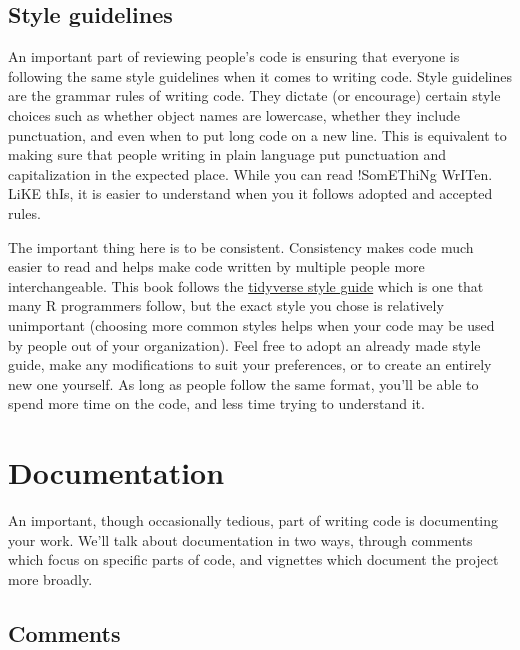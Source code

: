 \documentclass[
  12pt,
  openany]{book}
\begin{document}
\hypertarget{style-guidelines}{%
\subsection{Style guidelines}\label{style-guidelines}}

An important part of reviewing people's code is ensuring that everyone is following the same style guidelines when it comes to writing code. Style guidelines are the grammar rules of writing code. They dictate (or encourage) certain style choices such as whether object names are lowercase, whether they include punctuation, and even when to put long code on a new line. This is equivalent to making sure that people writing in plain language put punctuation and capitalization in the expected place. While you can read !SomEThiNg WrITen. LiKE thIs, it is easier to understand when you it follows adopted and accepted rules.

The important thing here is to be consistent. Consistency makes code much easier to read and helps make code written by multiple people more interchangeable. This book follows the \href{https://style.tidyverse.org/}{tidyverse style guide} which is one that many R programmers follow, but the exact style you chose is relatively unimportant (choosing more common styles helps when your code may be used by people out of your organization). Feel free to adopt an already made style guide, make any modifications to suit your preferences, or to create an entirely new one yourself. As long as people follow the same format, you'll be able to spend more time on the code, and less time trying to understand it.

\hypertarget{documentation}{%
\section{Documentation}\label{documentation}}

An important, though occasionally tedious, part of writing code is documenting your work. We'll talk about documentation in two ways, through comments which focus on specific parts of code, and vignettes which document the project more broadly.

\hypertarget{comments}{%
\subsection{Comments}\label{comments}}
\end{document}
